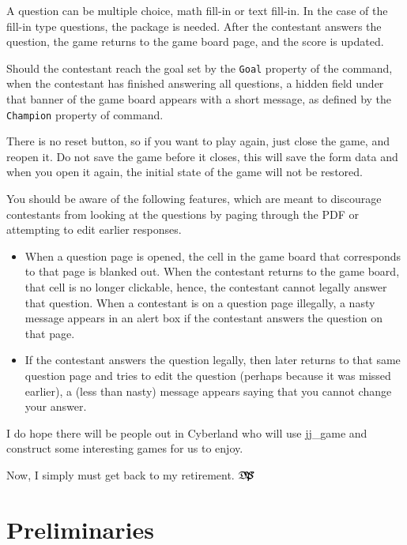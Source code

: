 \documentclass{article}
\def\dps{$\hbox{$\mathfrak D$\kern-.3em\hbox{$\mathfrak P$}%
   \kern-.6em \hbox{$\mathcal S$}}$}
\def\jj{\textsf{jj\_game}}
\begin{document}
A question can be multiple choice, math fill-in or text fill-in. In
the case of the fill-in type questions, the  package is
needed. After the contestant answers the question, the game returns
to the game board page, and the score is updated.

Should the contestant reach the goal set by the \texttt{Goal}
property of the  command, when the contestant has
finished answering all questions, a hidden field under that banner
of the game board appears with a short message, as defined by the
\texttt{Champion} property of  command.

There is no reset button, so if you want to play again, just close the game,
and reopen it. Do not save the game before it closes, this will save the form
data and when you open it again, the initial state of the game will not be
restored.

You should be aware of the following features, which are meant to
discourage contestants from looking at the questions by paging
through the PDF or attempting to edit earlier responses.
\begin{itemize}
\item When a question page is opened, the cell in the
    game board that corresponds to that page is blanked out. When
    the contestant returns to the game board, that cell is no longer
    clickable, hence, the contestant cannot legally answer that
    question. When a contestant is on a question page illegally, a
    nasty message appears in an alert box if the contestant answers
    the question on that page.
\item If the contestant answers the question legally, then later returns
    to that same question page and tries to edit the question
    (perhaps because it was missed earlier), a (less than nasty)
    message appears saying that you cannot change your answer.
\end{itemize}

I do hope there will be people out in Cyberland who will use {\jj}
and construct some interesting games for us to enjoy.

\medskip\noindent
Now, I simply must get back to my retirement. \dps

\section{Preliminaries}

\end{document}
